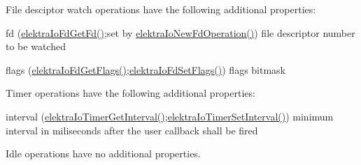 File desciptor watch operations have the following additional properties\+:
\begin{DoxyItemize}
\item fd (\hyperlink{io_8c_a7dec6afadd09f6350f9ad642906fc88a}{elektra\+Io\+Fd\+Get\+Fd()};set by \hyperlink{io_8c_a3804183da1aecdfcf09455d246c3891c}{elektra\+Io\+New\+Fd\+Operation()}) file descriptor number to be watched
\item flags (\hyperlink{io_8c_a8e2d356be0d89af3e46ebc8ce675db37}{elektra\+Io\+Fd\+Get\+Flags()};\hyperlink{io_8c_a1fd34686b0b3b1db5f460ea8c40ba5a8}{elektra\+Io\+Fd\+Set\+Flags()}) flags bitmask
\end{DoxyItemize}

Timer operations have the following additional properties\+:
\begin{DoxyItemize}
\item interval (\hyperlink{io_8c_abc383110a8cb712a0a35b958b4e446ea}{elektra\+Io\+Timer\+Get\+Interval()};\hyperlink{io_8c_a3e317e4c6e5869f296261c24312507ed}{elektra\+Io\+Timer\+Set\+Interval()}) minimum interval in miliseconds after the user callback shall be fired
\end{DoxyItemize}

Idle operations have no additional properties.

